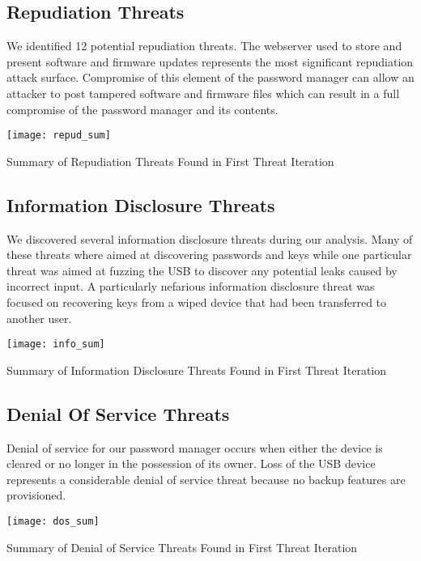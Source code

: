 \subsection{Repudiation Threats}


We identified 12 potential repudiation threats.  The webserver used to store and present software and firmware updates
represents the most significant repudiation attack surface.  Compromise of this
element of the password manager can allow an attacker to post tampered software
and firmware files which can result in a full compromise of the password manager
and its contents.
\begin{table*}[ht]
    \centering
    \texttt{[image: repud\_sum]}
    \caption{Summary of Repudiation Threats Found in First Threat Iteration}
    \label{tab:repudsum}
\end{table*}



\subsection{Information Disclosure Threats}
We discovered several information disclosure threats during our analysis.  Many
of these threats where aimed at discovering passwords and keys while one
particular threat was aimed at fuzzing the USB to discover any potential leaks
caused by incorrect input.  A particularly nefarious information disclosure threat
was focused on recovering keys from a wiped device that had been transferred to
another user.

\begin{table*}[ht]
    \centering
    \texttt{[image: info\_sum]}
    \caption{Summary of Information Disclosure Threats Found in First Threat Iteration}
    \label{tab:infosum}
\end{table*}


\subsection{Denial Of Service Threats}
Denial of service for our password manager occurs when either the device is
cleared or no longer in the possession of its owner.  Loss of the USB device
represents a considerable denial of service threat because no backup features
are provisioned.
\begin{table*}[ht]
    \centering
    \texttt{[image: dos\_sum]}
    \caption{Summary of Denial of Service Threats Found in First Threat Iteration}
    \label{tab:dossum}
\end{table*}

